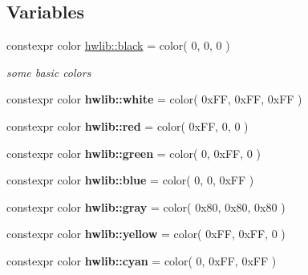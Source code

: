 \subsection*{Variables}
{\bf }\par
\begin{DoxyCompactItemize}
\item 
constexpr color \hyperlink{hwlib-graphics_8hpp_aa9c056fa29bc9af9f55d4b774bb3898a}{hwlib\+::black} = color( 0, 0, 0 )\hypertarget{hwlib-graphics_8hpp_aa9c056fa29bc9af9f55d4b774bb3898a}{}\label{hwlib-graphics_8hpp_aa9c056fa29bc9af9f55d4b774bb3898a}

\begin{DoxyCompactList}\small\item\em some basic colors \end{DoxyCompactList}\item 
constexpr color {\bfseries hwlib\+::white} = color( 0x\+F\+F, 0x\+F\+F, 0x\+F\+F )\hypertarget{hwlib-graphics_8hpp_a4ef9e33ddbcac5e4dc5cf3190f9174a9}{}\label{hwlib-graphics_8hpp_a4ef9e33ddbcac5e4dc5cf3190f9174a9}

\item 
constexpr color {\bfseries hwlib\+::red} = color( 0x\+F\+F, 0, 0 )\hypertarget{hwlib-graphics_8hpp_a5b1deea018f5b78012a5556553740614}{}\label{hwlib-graphics_8hpp_a5b1deea018f5b78012a5556553740614}

\item 
constexpr color {\bfseries hwlib\+::green} = color( 0, 0x\+F\+F, 0 )\hypertarget{hwlib-graphics_8hpp_a2473de6d95a7df78dac207d1b7e87c5c}{}\label{hwlib-graphics_8hpp_a2473de6d95a7df78dac207d1b7e87c5c}

\item 
constexpr color {\bfseries hwlib\+::blue} = color( 0, 0, 0x\+F\+F )\hypertarget{hwlib-graphics_8hpp_ae1184edd3998bcdb7061c0b1d38683b7}{}\label{hwlib-graphics_8hpp_ae1184edd3998bcdb7061c0b1d38683b7}

\item 
constexpr color {\bfseries hwlib\+::gray} = color( 0x80, 0x80, 0x80 )\hypertarget{hwlib-graphics_8hpp_a2e05dcb77590ae391ad3027f4097ec77}{}\label{hwlib-graphics_8hpp_a2e05dcb77590ae391ad3027f4097ec77}

\item 
constexpr color {\bfseries hwlib\+::yellow} = color( 0x\+F\+F, 0x\+F\+F, 0 )\hypertarget{hwlib-graphics_8hpp_a5f5e78ccc187ac0649358ce77cb7173f}{}\label{hwlib-graphics_8hpp_a5f5e78ccc187ac0649358ce77cb7173f}

\item 
constexpr color {\bfseries hwlib\+::cyan} = color( 0, 0x\+F\+F, 0x\+F\+F )\hypertarget{hwlib-graphics_8hpp_a2de8bf807b29ec14038fbb448ad4e0e7}{}\label{hwlib-graphics_8hpp_a2de8bf807b29ec14038fbb448ad4e0e7}


\end{DoxyCompactItemize}
